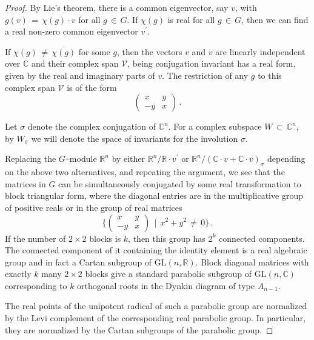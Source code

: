 \documentclass[12pt]{amsart}
\begin{document}
\begin{proof}
By Lie's theorem, there is a common eigenvector, say $v$, with $g(v)\,=\,
\chi(g)\cdot v$ for all $g\, \in\, G$. If $\chi(g)$ is real for all $g\,
\in\, G$, then we can find a real non-zero common eigenvector $v^{\prime }$.

If $\chi(g)\,\not=\, \overline{\chi(g)}$ for some $g$, then the vectors $v$
and $\overline{v}$ are linearly independent over $\mathbb{C}$ and their
complex span $\mathcal{V}$, being conjugation invariant has a real form,
given by the real and imaginary parts of $v$. The restriction of any $g$ to
this complex span $\mathcal{V}$ is of the form
\begin{equation*}
\begin{pmatrix}
x & y \\
-y & x
\end{pmatrix}
\, .
\end{equation*}

Let $\sigma$ denote the complex conjugation of ${\mathbb{C}}^n$. For a
complex subspace $W\, \subset\, {\mathbb{C}}^n$, by $W_\sigma$ we will
denote the space of invariants for the involution $\sigma$.

Replacing the $G$--module ${\mathbb{R}}^n$ by either ${\mathbb{R}}^n/
{\mathbb{R}}\cdot v^{\prime }$ or ${\mathbb{R}}^n/({\mathbb{C}}\cdot v+
{\mathbb{C}}\cdot \overline{v})_\sigma$ depending on the above two
alternatives, and repeating the argument, we see that the matrices in $G$
can be simultaneously conjugated by some real transformation to block
triangular form, where the diagonal entries are in the multiplicative group
of positive reals or in the group of real matrices
\begin{equation*}
\{
\begin{pmatrix}
x & y \\
-y & x
\end{pmatrix}
\, \mid\, x^2+y^2 \,\not=\, 0\}\, .
\end{equation*}
If the number of $2\times 2$ blocks is $k$, then this group has $2^k$
connected components. The connected component of it containing the identity
element is a real algebraic group and in fact a Cartan subgroup of
$\text{GL}(n, {\mathbb{R}})$. Block diagonal matrices with exactly $k$ many $2\times 2$
blocks give a standard parabolic subgroup of $\text{GL}(n, {\mathbb{C}})$
corresponding to $k$ orthogonal roots in the Dynkin diagram of type $A_{n-1}$.

The real points of the unipotent radical of such a parabolic group are
normalized by the Levi complement of the corresponding real parabolic group.
In particular, they are normalized by the Cartan subgroups of the parabolic
group.
\end{proof}
\end{document}

